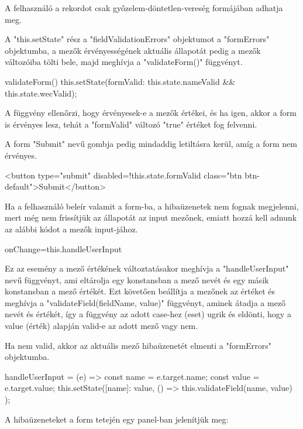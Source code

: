A felhasználó a rekordot csak győzelem-döntetlen-vereség formájában adhatja meg.

A "this.setState" rész a "fieldValidationErrors" objektumot a "formErrors" objektumba, a mezők érvényességének aktuális állapotát pedig a mezők változóiba tölti bele, majd meghívja a "validateForm()" függvényt.

\begin{cpp}
validateForm() {
 this.setState({formValid: this.state.nameValid && this.state.wecValid});
}
\end{cpp}

A függvény ellenőrzi, hogy érvényesek-e a mezők értékei, és ha igen, akkor a form is érvényes lesz, tehát a "formValid" változó "true" értéket fog felvenni.

A form "Submit" nevű gombja pedig mindaddig letiltásra kerül, amíg a form nem érvényes.

\begin{cpp}
<button type="submit" disabled={!this.state.formValid} 
class="btn btn-default">Submit</button>
\end{cpp}

Ha a felhasználó beleír valamit a form-ba, a hibaüzenetek nem fognak megjelenni, mert még nem frissítjük az állapotát az input mezőnek, emiatt hozzá kell adnunk az alábbi kódot a mezők input-jához.

\begin{cpp}
onChange={this.handleUserInput}
\end{cpp}

Ez az esemény a mező értékének változtatásakor meghívja a "handleUserInput" nevű függvényt, ami eltárolja egy konstansban a mező nevét és egy másik konstansban a mező értékét. Ezt követően beállítja a mezőnek az értéket és meghívja a "validateField(fieldName, value)" függvényt, aminek átadja a mező nevét és értékét, így a függvény az adott case-hez (eset) ugrik és eldönti, hogy a value (érték) alapján valid-e az adott mező vagy nem.

Ha nem valid, akkor az aktuális mező hibaüzenetét elmenti a "formErrors" objektumba.

\begin{cpp}
handleUserInput = (e) => {
    const name = e.target.name;
    const value = e.target.value;
    this.setState({[name]: value},
                  () => { this.validateField(name, value) }); }
\end{cpp}

A hibaüzeneteket a form tetején egy panel-ban jelenítjük meg:

